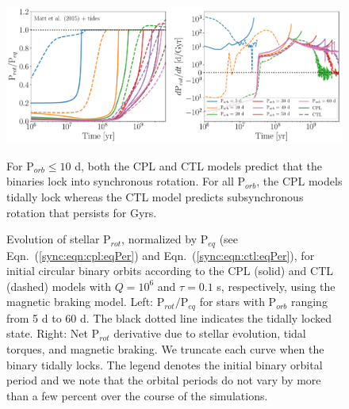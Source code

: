 \begin{figure}
	\includegraphics[width=\columnwidth]{eqPerTwoPanelMatt.pdf}
   \caption{Evolution of stellar P$_{rot}$, normalized by P$_{eq}$ (see Eqn.~(\ref{sync:eqn:cpl:eqPer}) and Eqn.~(\ref{sync:eqn:ctl:eqPer}), for initial circular binary orbits according to the CPL (solid) and CTL (dashed) models with $Q = 10^6$ and $\tau = 0.1$ s, respectively, using the \citet{Matt2015} magnetic braking model. Left: P$_{rot}/$P$_{eq}$ for stars with P$_{orb}$ ranging from 5 d to 60 d. The black dotted line indicates the tidally locked state.  Right: Net P$_{rot}$ derivative due to stellar evolution, tidal torques, and magnetic braking.  We truncate each curve when the binary tidally locks. The legend denotes the initial binary orbital period and we note that the orbital periods do not vary by more than a few percent over the course of the simulations.} For P$_{orb} \leq 10$ d, both the CPL and CTL models predict that the binaries lock into synchronous rotation.  For all P$_{orb}$, the CPL models tidally lock whereas the CTL model predicts subsynchronous rotation that persists for Gyrs.%
    \label{sync:fig:eqPer}%
\end{figure}


